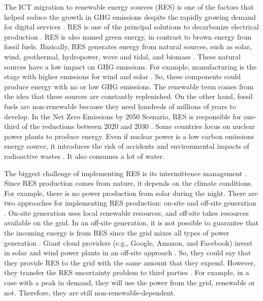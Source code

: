 The ICT migration to renewable energy sources (RES) is one of the factors that helped reduce the growth in GHG emissions despite the rapidly growing demand for digital services \cite{centres2022data}. RES is one of the principal solutions to decarbonize electrical production \cite{olabi2022renewable, rostirolla2022survey}. RES is also named green energy, in contrast to brown energy from fossil fuels. Basically, RES generates energy from natural sources, such as solar, wind, geothermal, hydropower, wave and tidal, and biomass \cite{augustine2012renewable, panwar2011role, rostirolla2022survey, UNREnewable, gross2003progress}. These natural sources have a low impact on GHG emissions. For example, manufacturing is the stage with higher emissions for wind and solar \cite{amponsah2014greenhouse}. So, these components could produce energy with no or low GHG emissions. The renewable term comes from the idea that these sources are constantly replenished. On the other hand, fossil fuels are non-renewable because they need hundreds of millions of years to develop. In the Net Zero Emissions by 2050 Scenario, RES is responsible for one-third of the reductions between 2020 and 2030 \cite{renewables2022}. Some countries focus on nuclear power plants to produce energy. Even if nuclear power is a low carbon emissions energy source, it introduces the risk of accidents and environmental impacts of radioactive wastes \cite{kunsch2014nuclear}. It also consumes a lot of water.

The biggest challenge of implementing RES is its intermittence management \cite{rostirolla2022survey}. Since RES production comes from nature, it depends on the climate conditions. For example, there is no power production from solar during the night. There are two approaches for implementing RES production: on-site and off-site generation \cite{ren2012carbon}. On-site generation uses local renewable resources, and off-site takes resources available on the grid. In an off-site generation, it is not possible to guarantee that the incoming energy is from RES since the grid mixes all types of power generation \cite{rostirolla2022survey}. Giant cloud providers (e.g., Google, Amazon, and Facebook) invest in solar and wind power plants in an off-site approach \cite{Masanet984, branscombe2020google, amazon2023}. So, they could say that they provide RES to the grid with the same amount that they expend. However, they transfer the RES uncertainty problem to third parties \cite{rostirolla2022survey}. For example, in a case with a peak in demand, they will use the power from the grid, renewable or not. Therefore, they are still non-renewable-dependent.

